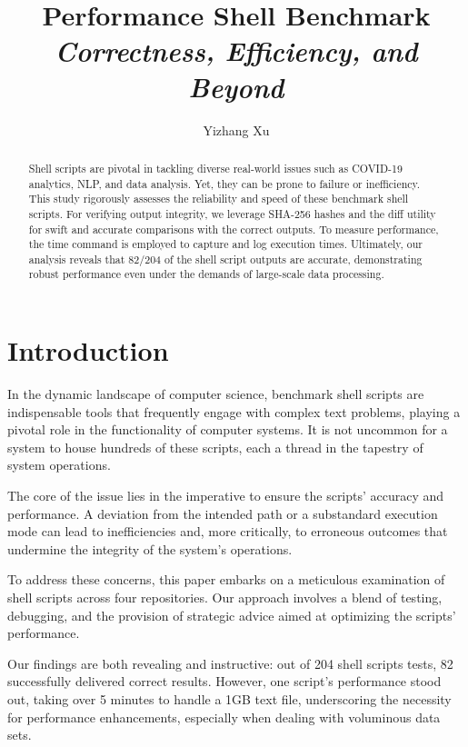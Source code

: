 \documentclass[sigplan, screen, 10pt]{acmart}
\title{Performance Shell Benchmark \newline
\emph{Correctness, Efficiency, and Beyond}}
\author{Yizhang Xu}
\affiliation{BUPT}
\begin{document}
\begin{abstract}
Shell scripts are pivotal in tackling diverse real-world issues such as COVID-19 analytics, NLP, and data analysis. 
Yet, they can be prone to failure or inefficiency.
This study rigorously assesses the reliability and speed of these benchmark shell scripts.
For verifying output integrity, we leverage SHA-256 hashes and the diff utility for swift and accurate comparisons with the correct outputs.
To measure performance, the time command is employed to capture and log execution times.
Ultimately, our analysis reveals that 82/204 of the shell script outputs are accurate, demonstrating robust performance even under the demands of large-scale data processing.
\end{abstract}

\maketitle


\section{Introduction}
\label{intro}
In the dynamic landscape of computer science, benchmark shell scripts are indispensable tools that frequently engage with complex text problems, playing a pivotal role in the functionality of computer systems.
It is not uncommon for a system to house hundreds of these scripts, each a thread in the tapestry of system operations.\par
The core of the issue lies in the imperative to ensure the scripts' accuracy and performance. 
A deviation from the intended path or a substandard execution mode can lead to inefficiencies and, more critically, to erroneous outcomes that undermine the integrity of the system's operations.\par
To address these concerns, this paper embarks on a meticulous examination of shell scripts across four repositories. 
Our approach involves a blend of testing, debugging, and the provision of strategic advice aimed at optimizing the scripts' performance.\par
Our findings are both revealing and instructive: out of 204 shell scripts tests, 82 successfully delivered correct results. 
However, one script's performance stood out, taking over 5 minutes to handle a 1GB text file, underscoring the necessity for performance enhancements, especially when dealing with voluminous data sets.
\end{document}
